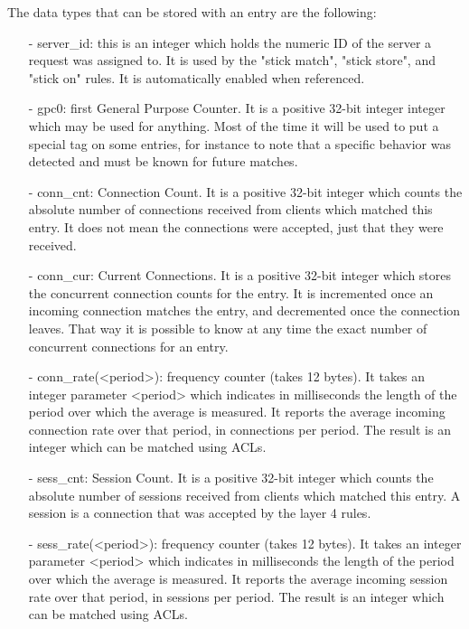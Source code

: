   The data types that can be stored with an entry are the following:
  \begin{itemize}
  \item[-] server\_id: this is an integer which holds the numeric ID of the server a
      request was assigned to. It is used by the "stick match", "stick store",
      and "stick on" rules. It is automatically enabled when referenced.

  \item[-] gpc0: first General Purpose Counter. It is a positive 32-bit integer
      integer which may be used for anything. Most of the time it will be used
      to put a special tag on some entries, for instance to note that a
      specific behavior was detected and must be known for future matches.

  \item[-] conn\_cnt: Connection Count. It is a positive 32-bit integer which counts
      the absolute number of connections received from clients which matched
      this entry. It does not mean the connections were accepted, just that
      they were received.

  \item[-] conn\_cur: Current Connections. It is a positive 32-bit integer which
      stores the concurrent connection counts for the entry. It is incremented
      once an incoming connection matches the entry, and decremented once the
      connection leaves. That way it is possible to know at any time the exact
      number of concurrent connections for an entry.

  \item[-] conn\_rate(<period>): frequency counter (takes 12 bytes). It takes an
      integer parameter <period> which indicates in milliseconds the length
      of the period over which the average is measured. It reports the average
      incoming connection rate over that period, in connections per period. The
      result is an integer which can be matched using ACLs.

  \item[-] sess\_cnt: Session Count. It is a positive 32-bit integer which counts
      the absolute number of sessions received from clients which matched this
      entry. A session is a connection that was accepted by the layer 4 rules.

  \item[-] sess\_rate(<period>): frequency counter (takes 12 bytes). It takes an
      integer parameter <period> which indicates in milliseconds the length
      of the period over which the average is measured. It reports the average
      incoming session rate over that period, in sessions per period. The
      result is an integer which can be matched using ACLs.


\end{itemize}
